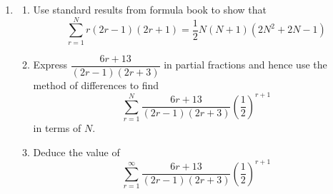 \documentclass[leqno]{article}
\newcommand{\cxl}[2]{%
  \tikz[baseline=(X.base)]{%
    \node[inner sep=0pt, outer sep=0pt, text=#1] (X) {$#2$};
    \draw[#1, line width=0.4pt] (X.south west)--(X.north east);
  }%
}
\newcommand{\questionitem}{%
  \item\phantomsection
  \addcontentsline{toc}{section}{Question \number\value{enumi}}%
}
\begin{document}
\begin{enumerate}[
  label=\textbf{\arabic*.},
  leftmargin=*,
  topsep=0pt,
  partopsep=0pt,
  parsep=0pt
]
\begin{tcolorbox}[colback=white, colframe=scarlet, title={\textbf{Solution}}, breakable, grow to left by=6mm, grow to right by=10mm]
So
\[
S=\frac13\sum_{r=1}^n\left(\frac1r-\frac1{r+3}\right)
\]

Now write out the terms to use the method of differences:
\begin{align*}
S
&=\frac13\Biggl[
1+\frac12+\frac13+\cxl{blue}{\frac14}+\cxl{red}{\frac15}+\cdots+\cxl{teal}{\frac1n}\\
&\qquad\qquad\qquad
-\cxl{blue}{\frac14}-\cxl{red}{\frac15}-\cdots-\cxl{teal}{\frac1n}-\frac1{n+1}-\frac1{n+2}-\frac1{n+3}
\Biggr]
\end{align*}

Everything from $\frac14$ to $\frac1n$ cancels, leaving
\[
S=\frac13\left(1+\frac12+\frac13-\frac1{n+1}-\frac1{n+2}-\frac1{n+3}\right)
\]

Now
\[
1+\frac12+\frac13=\frac{6+3+2}{6}=\frac{11}{6}
\]

Hence
\[
S=\frac{11}{18}-\frac13\left(\frac1{n+1}+\frac1{n+2}+\frac1{n+3}\right)
\]

Combine the three fractions:
\[
\frac1{n+1}+\frac1{n+2}+\frac1{n+3}
=\frac{(n+2)(n+3)+(n+1)(n+3)+(n+1)(n+2)}{(n+1)(n+2)(n+3)}
\]

Expand the numerator:
\begin{align*}
(n+2)(n+3)&=n^2+5n+6 \\
(n+1)(n+3)&=n^2+4n+3 \\
(n+1)(n+2)&=n^2+3n+2
\end{align*}

So
\[
(n+2)(n+3)+(n+1)(n+3)+(n+1)(n+2)=3n^2+12n+11
\]

Therefore
\[
S=\frac{11}{18}-\frac{3n^2+12n+11}{3(n+1)(n+2)(n+3)}
\]

Comparing with
\[
\frac{11}{18}-\frac{an^2+bn+c}{3(n+1)(n+2)(n+3)}
\]
we get
\[
a=3,\qquad b=12,\qquad c=11
\]

So the required result is
\[
\frac{1}{1 \times 4} + \frac{1}{2 \times 5} + \frac{1}{3 \times 6} + \cdots + \frac{1}{n(n+3)}
= \frac{11}{18} - \frac{3n^2+12n+11}{3(n+1)(n+2)(n+3)}
\]
\end{tcolorbox}


\newpage

\questionitem

\begin{enumerate}[label=\textbf{(\alph*)}]
  \item Use standard results from formula book to show that
  \[
  \sum_{r=1}^{N} r(2r-1)(2r+1)=\frac{1}{2}N(N+1)(2N^2+2N-1)
  \]
  \item Express $\dfrac{6r+13}{(2r-1)(2r+3)}$ in partial fractions and hence use the method of differences to find
  \[
  \sum_{r=1}^{N} \frac{6r+13}{(2r-1)(2r+3)}\left(\frac{1}{2}\right)^{r+1}
  \]
  in terms of $N$.  \\
  \item Deduce the value of
  \[
  \sum_{r=1}^{\infty} \frac{6r+13}{(2r-1)(2r+3)}\left(\frac{1}{2}\right)^{r+1}
  \]
\end{enumerate}


\end{enumerate}
\end{document}
